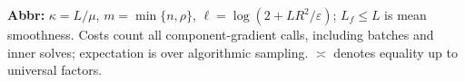 \begin{table}[tp]
\begin{threeparttable}
\begin{tabularx}{\linewidth}{@{}>{\raggedright\arraybackslash}p{0.20\linewidth}>{\raggedright\arraybackslash}p{0.32\linewidth}>{\raggedright\arraybackslash}p{0.25\linewidth}>{\raggedright\arraybackslash}X@{}}
\bottomrule
\end{tabularx}
\begin{tablenotes}[flushleft]\footnotesize
\item[] \textbf{Abbr:} $\kappa=L/\mu$, $m=\min\{n,\rho\}$, $\ell=\log(2+LR^2/\varepsilon)$; $L_f\le L$ is mean smoothness. Costs count all component-gradient calls, including batches and inner solves; expectation is over algorithmic sampling. $\asymp$ denotes equality up to universal factors.
\end{tablenotes}
\end{threeparttable}
\end{table}
\clearpage
